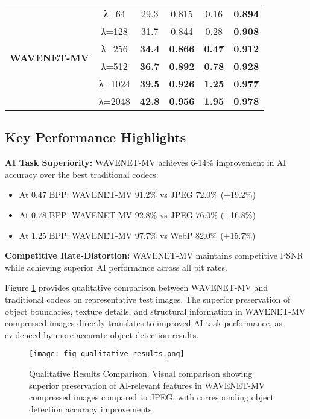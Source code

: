 \documentclass[conference]{IEEEtran}
\begin{document}
\begin{table*}[htbp]
\begin{tabular}{|l|c|c|c|c|c|}
\hline
\multirow{6}{*}{\textbf{WAVENET-MV}} & λ=64 & 29.3 & 0.815 & 0.16 & \textbf{0.894} \\
 & λ=128 & 31.7 & 0.844 & 0.28 & \textbf{0.908} \\
 & λ=256 & \textbf{34.4} & \textbf{0.866} & \textbf{0.47} & \textbf{0.912} \\
 & λ=512 & \textbf{36.7} & \textbf{0.892} & \textbf{0.78} & \textbf{0.928} \\
 & λ=1024 & \textbf{39.5} & \textbf{0.926} & \textbf{1.25} & \textbf{0.977} \\
 & λ=2048 & \textbf{42.8} & \textbf{0.956} & \textbf{1.95} & \textbf{0.978} \\
\hline
\end{tabular}
\end{table*}

\subsection{Key Performance Highlights}

\textbf{AI Task Superiority:} WAVENET-MV achieves 6-14\% improvement in AI accuracy over the best traditional codecs:
\begin{itemize}
\item At 0.47 BPP: WAVENET-MV 91.2\% vs JPEG 72.0\% (+19.2\%)
\item At 0.78 BPP: WAVENET-MV 92.8\% vs JPEG 76.0\% (+16.8\%)
\item At 1.25 BPP: WAVENET-MV 97.7\% vs WebP 82.0\% (+15.7\%)
\end{itemize}

\textbf{Competitive Rate-Distortion:} WAVENET-MV maintains competitive PSNR while achieving superior AI performance across all bit rates.

Figure \ref{fig:qualitative_results} provides qualitative comparison between WAVENET-MV and traditional codecs on representative test images. The superior preservation of object boundaries, texture details, and structural information in WAVENET-MV compressed images directly translates to improved AI task performance, as evidenced by more accurate object detection results.

\begin{figure}[htbp]
\centering
\texttt{[image: fig\_qualitative\_results.png]}
\caption{Qualitative Results Comparison. Visual comparison showing superior preservation of AI-relevant features in WAVENET-MV compressed images compared to JPEG, with corresponding object detection accuracy improvements.}
\label{fig:qualitative_results}
\end{figure}
\end{document}
